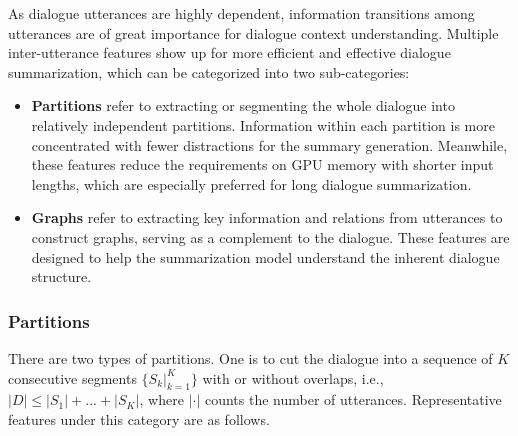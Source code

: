 As dialogue utterances are highly dependent, information transitions among utterances are of great importance for dialogue context understanding. 
Multiple inter-utterance features show up for more efficient and 
effective dialogue summarization, which can be categorized into 
two sub-categories:
\begin{itemize}
	\item \textbf{Partitions} refer to extracting or segmenting the whole dialogue into relatively independent partitions. Information within each partition is more concentrated with fewer distractions for the summary generation. Meanwhile, these features reduce the requirements on GPU memory with shorter input lengths, which are especially preferred for long dialogue summarization.
	\item \textbf{Graphs} refer to extracting key information and relations from utterances to construct graphs, serving as a complement to the dialogue. These features are designed to help the summarization model understand the inherent dialogue structure.
\end{itemize}


\subsubsection{Partitions} 

There are two types of partitions.
One is to cut the dialogue into a sequence of $K$ consecutive segments $\{S_k|_{k=1}^K\}$ with or without overlaps, i.e., $|D|\leq|S_1| + ... + |S_K|$, where $|\cdot|$ counts the number of utterances. Representative features under this category are as follows.


